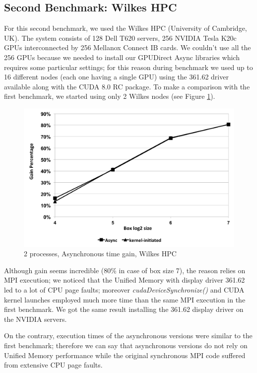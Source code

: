 \documentclass[conference]{IEEEtran}
\begin{document}

\subsection{Second Benchmark: Wilkes HPC}

For this second benchmark, we used the Wilkes HPC (University of Cambridge, UK)\cite{wilkes}. The system consists of 128 Dell T620 servers, 256 NVIDIA Tesla K20c GPUs interconnected by 256 Mellanox Connect IB cards.
We couldn't use all the 256 GPUs because we needed to install our GPUDirect Async libraries which requires some particular settings; for this reason during benchmark we used up to 16 different nodes (each one having a single GPU) using the 361.62 driver available along with the CUDA 8.0 RC package.
To make a comparison with the first benchmark, we started using only 2 Wilkes nodes (see Figure \ref{fig:gain_wilkes}).

\begin{figure}[h]
\includegraphics[scale=0.4]{gain_wilkes.png}
\caption{2 processes, Asynchronous time gain, Wilkes HPC}
\label{fig:gain_wilkes}
\end{figure}

Although gain seems incredible (80\% in case of box size 7), the reason relies on MPI execution; we noticed that the Unified Memory with display driver 361.62 led to a lot of CPU page faults; moreover \textit{cudaDeviceSynchronize()} and CUDA kernel launches employed much more time than the same MPI execution in the first benchmark. We got the same result installing the 361.62 display driver on the NVIDIA servers.

On the contrary, execution times of the asynchronous versions were similar to the first benchmark; therefore we can say that asynchronous versions do not rely on Unified Memory performance while the original synchronous MPI code suffered from extensive CPU page faults.\\
\end{document}
